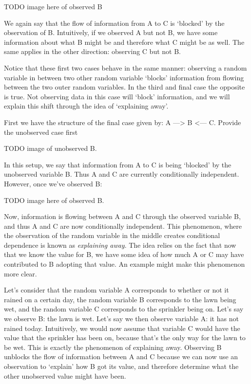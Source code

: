 TODO image here of observed B

We again say that the flow of information from A to C is `blocked' by the observation of B. Intuitively, if we observed A but not B, we have some information about what B might be and therefore what C might be as well.  The same applies in the other direction: observing C but not B.

Notice that these first two cases behave in the same manner: observing a random variable in between two other random variable `blocks' information from flowing between the two outer random variables. In the third and final case the opposite is true. Not observing data in this case will `block' information, and we will explain this shift through the idea of `explaining away'.

First we have the structure of the final case given by: A ---> B <--- C. Provide the unobserved case first

TODO image of unobserved B.

In this setup, we say that information from A to C is being `blocked' by the unobserved variable B. Thus A and C are currently conditionally independent. However, once we've observed B:

TODO image here of observed B.

Now, information is flowing between A and C through the observed variable B, and thus A and C are now conditionally independent. This phenomenon, where the observation of the random variable in the middle creates conditional dependence is known as \textit{explaining away}. The idea relies on the fact that now that we know the value for B, we have some idea of how much A or C may have contributed to B adopting that value. An example might make this phenomenon more clear.

Let's consider that the random variable A corresponds to whether or not it rained on a certain day, the random variable B corresponds to the lawn being wet, and the random variable C corresponds to the sprinkler being on. Let's say we observe B: the lawn is wet. Let's say we then observe variable A: it has not rained today. Intuitively, we would now assume that variable C would have the value that the sprinkler has been on, because that's the only way for the lawn to be wet. This is exactly the phenomenon of explaining away. Observing B unblocks the flow of information between A and C because we can now use an observation to `explain' how B got its value, and therefore determine what the other unobserved value might have been.

